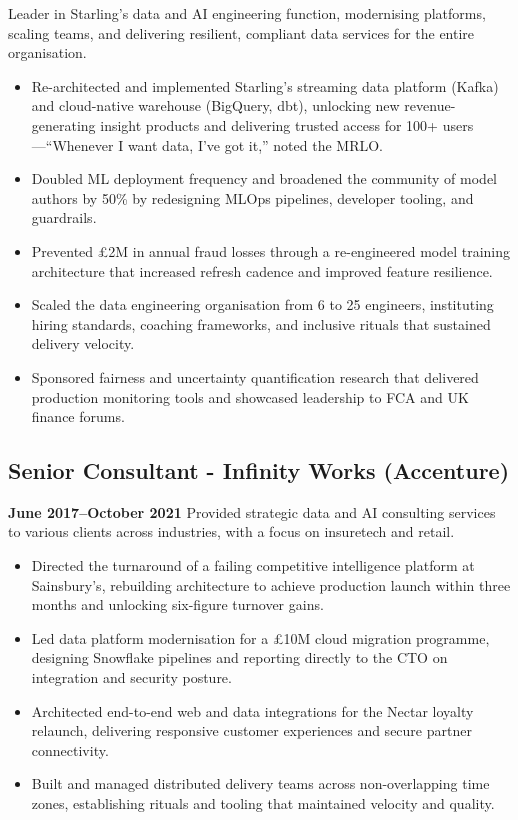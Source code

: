 \documentclass[a4paper]{scrartcl}
\begin{document}
Leader in Starling's data and AI engineering function, modernising platforms, scaling teams, and delivering resilient, compliant data services for the entire organisation.
\begin{itemize}
	\item Re-architected and implemented Starling's streaming data platform (Kafka) and cloud-native warehouse (BigQuery, dbt), unlocking new revenue-generating insight products and delivering trusted access for 100+ users—``Whenever I want data, I've got it,'' noted the MRLO.
	\item Doubled ML deployment frequency and broadened the community of model authors by 50\% by redesigning MLOps pipelines, developer tooling, and guardrails.
	\item Prevented £2M in annual fraud losses through a re-engineered model training architecture that increased refresh cadence and improved feature resilience.
	\item Scaled the data engineering organisation from 6 to 25 engineers, instituting hiring standards, coaching frameworks, and inclusive rituals that sustained delivery velocity.
	\item Sponsored fairness and uncertainty quantification research that delivered production monitoring tools and showcased leadership to FCA and UK finance forums.
\end{itemize}

\subsection*{Senior Consultant - Infinity Works (Accenture)}
\textbf{June 2017--October 2021}
Provided strategic data and AI consulting services to various clients across industries, with a focus on insuretech and retail.
\begin{itemize}
	\item Directed the turnaround of a failing competitive intelligence platform at Sainsbury's, rebuilding architecture to achieve production launch within three months and unlocking six-figure turnover gains.
	\item Led data platform modernisation for a £10M cloud migration programme, designing Snowflake pipelines and reporting directly to the CTO on integration and security posture.
	\item Architected end-to-end web and data integrations for the Nectar loyalty relaunch, delivering responsive customer experiences and secure partner connectivity.
	\item Built and managed distributed delivery teams across non-overlapping time zones, establishing rituals and tooling that maintained velocity and quality.
\end{itemize}
\end{document}
